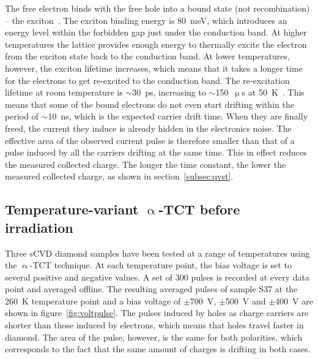 The free electron binds with the free hole into a bound state (not recombination) -- the exciton~\cite{1970PhyEd...5..226L}. The exciton binding energy is 80~meV, which introduces an energy level within the forbidden gap just under the conduction band. At higher temperatures the lattice provides enough energy to thermally excite the electron from the exciton state back to the conduction band. At lower temperatures, however, the exciton lifetime increases, which means that it takes a longer time for the electrons to get re-excited to the conduction band. The re-excitation lifetime at room temperature is $\sim$30~ps, increasing to $\sim$150~$\upmu$s at 50~K~\cite{Jansen:1956431}. This means that some of the bound electrons do not even start drifting within the period of $\sim$10~ns, which is the expected carrier drift time. When they are finally freed, the current they induce is already hidden in the electronics noise. The effective area of the observed current pulse is therefore smaller than that of a pulse induced by all the carriers drifting at the same time. This in effect reduces the measured collected charge. The longer the time constant, the lower the measured collected charge, as shown in section~\ref{subsec:qvst}. %


%


\subsection{Temperature-variant $\upalpha$-TCT before irradiation}
Three sCVD diamond samples have been tested at a range of temperatures using the $\upalpha$-TCT technique. At each temperature point, the bias voltage is set to several positive and negative values. A set of 300 pulses is recorded at every data point and averaged offline. The resulting averaged pulses of sample S37 at the 260~K temperature point and a bias voltage of $\pm$700~V, $\pm$500~V and $\pm$400~V are shown in figure~\ref{fig:voltpulse}. The pulses induced by holes as charge carriers are shorter than those induced by electrons, which means that holes travel faster in diamond. The area of the pulse, however, is the same for both polarities, which corresponds to the fact that the same amount of charges is drifting in both cases.

